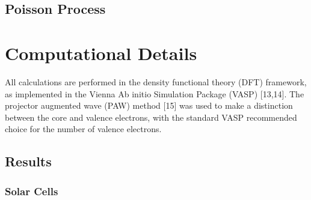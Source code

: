 \begin{refsection}
\section{Poisson Process} \label{sec:appendix-poisson}

\chapter{Computational Details} \label{appendix:sec-computational}

All calculations are performed in the density functional theory (DFT) framework, as implemented in the Vienna Ab initio Simulation Package (VASP) [13,14]. The projector augmented wave (PAW) method [15] was used to make a distinction between the core and valence electrons, with the standard VASP recommended choice for the number of valence electrons. 

\section{Results} \label{appendix:sec-results}

\subsection{Solar Cells} \label{appendix:sec-solar}


\end{refsection}
